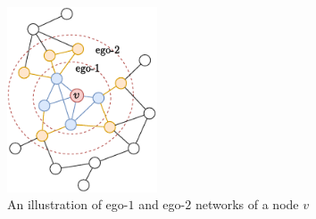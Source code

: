 \begin{figure}
    \includegraphics[height=5.5cm]{ego_network.pdf}
    \caption{An illustration of ego-$1$ and ego-$2$ networks of a node $v$}
    \label{fig:ego_network}
\end{figure}

